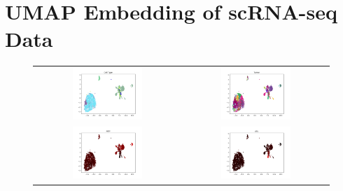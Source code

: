 \chapter{UMAP Embedding of scRNA-seq Data}
\label{appendix:umap_tirosh}
\begin{figure}[!htb]
  \centering
  \begin{tabular}{cc}
    \includegraphics[width=0.5\textwidth]{images/tumap_cell.png} &
    \includegraphics[width=0.5\textwidth]{images/tumap_tumor.png} \\
    \includegraphics[width=0.5\textwidth]{images/tumap_mitf.png} &
    \includegraphics[width=0.5\textwidth]{images/tumap_axl.png} \\

\end{tabular}
\end{figure}
